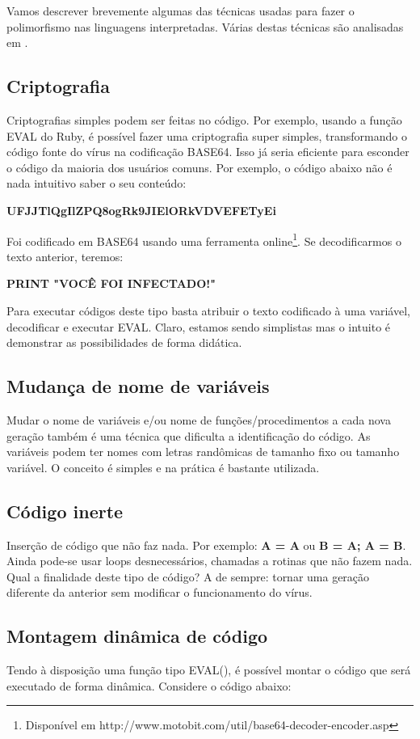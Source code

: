 Vamos descrever brevemente algumas das técnicas usadas para fazer o polimorfismo nas linguagens interpretadas. Várias destas técnicas são analisadas em \cite{szappanos:1}.

\subsection{Criptografia}
Criptografias simples podem ser feitas no código. Por exemplo, usando a função EVAL do Ruby, é possível fazer uma criptografia super simples, transformando o código fonte do vírus na codificação BASE64. Isso já seria eficiente para esconder o código da maioria dos usuários comuns. Por exemplo, o código abaixo não é nada intuitivo saber o seu conteúdo:

\textbf{UFJJTlQgIlZPQ8ogRk9JIElORkVDVEFETyEi}

Foi codificado em BASE64 usando uma ferramenta online\footnote{Disponível em http://www.motobit.com/util/base64-decoder-encoder.asp}. Se decodificarmos o texto anterior, teremos:

\textbf{PRINT "VOCÊ FOI INFECTADO!"}

Para executar códigos deste tipo basta atribuir o texto codificado à uma variável, decodificar e executar EVAL. Claro, estamos sendo simplistas mas o intuito é demonstrar as possibilidades de forma didática.

\subsection{Mudança de nome de variáveis}
Mudar o nome de variáveis e/ou nome de funções/procedimentos a cada nova geração também é uma técnica que dificulta a identificação do código. As variáveis podem ter nomes com letras randômicas de tamanho fixo ou tamanho variável. O conceito é simples e na prática é bastante utilizada.

\subsection{Código inerte}
Inserção de código que não faz nada. Por exemplo: \textbf{A = A} ou \textbf{B = A; A = B}. Ainda pode-se usar loops desnecessários, chamadas a rotinas que não fazem nada. Qual a finalidade deste tipo de código? A de sempre: tornar uma geração diferente da anterior sem modificar o funcionamento do vírus.

\subsection{Montagem dinâmica de código}
Tendo à disposição uma função tipo EVAL(), é possível montar o código que será executado de forma dinâmica. Considere o código abaixo:



